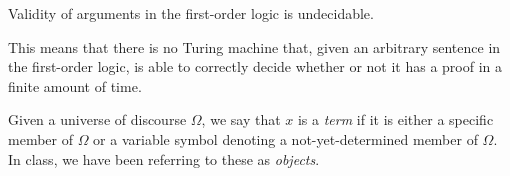 \begin{theorem}
    Validity of arguments in the first-order logic is undecidable.

    This means that there is no Turing machine that,
    given an arbitrary sentence in the first-order logic,
    is able to correctly decide whether or not it has a proof in a finite amount of time.
\end{theorem}

\begin{definition}[Term]
    Given a universe of discourse \(\Omega\),
    we say that \(x\) is a \emph{term} if it is either a specific member of \(\Omega\)
    or a variable symbol denoting a not-yet-determined member of \(\Omega\).
    In class, we have been referring to these as \emph{objects}.
\end{definition}

